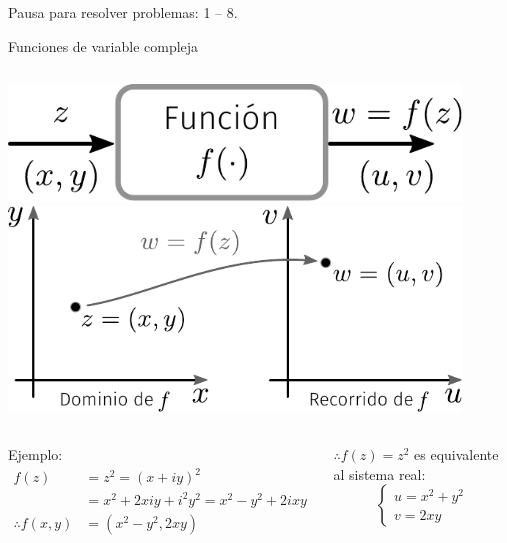 \documentclass[9pt, aspectratio=169]{beamer}
\begin{document}
\begin{frame}[standout]
 Pausa para resolver problemas: 1 -- 8.
\end{frame}





\begin{frame}{Funciones de variable compleja}
 \begin{columns}[c]
  \includegraphics[width=0.9\textwidth]{figs/fig-01} \pause
  \includegraphics[width=0.9\textwidth]{figs/fig-02}
 \end{columns} \pause
 
 \begin{columns}[c]
 \begin{exampleblock}{Ejemplo:}
  \begin{align*}
   f(z) &= z^2 = (x + iy)^2 \\
        &= x^2 + 2 x i y + i^2 y^2 = x^2 - y^2 + 2 i xy \\
   \therefore f(x, y) &= (x^2 - y^2, 2xy)
  \end{align*}
 \end{exampleblock} \pause
  $\therefore f(z) = z^2$ es equivalente al \alert{sistema real}: 
  \vspace{1em}
  \[
  \begin{cases*}
   u = x^2 + y^2 \\
   v = 2xy
  \end{cases*}
  \]
 \end{columns}
\end{frame}
\end{document}
